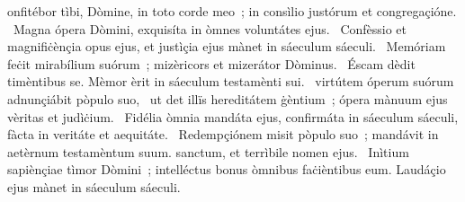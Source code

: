 { }
{%
onfitébor tìbi, Dòmine, in toto corde meo~; in consìlio justórum et congregaçióne. 
~Magna ópera Dòmini, exquisíta in òmnes voluntátes ejus. 
~Confèssio et magnifiċènçia opus ejus, et justìçia ejus mànet in sáeculum sáeculi. 
~Memóriam feċit mirabílium suórum~; mizèricors et mizerátor Dòminus. 
~Éscam dèdit timèntibus se. Mèmor èrit in sáeculum testamènti sui. 
~virtútem óperum suórum adnunçiábit pòpulo suo, 
~ut det illïs hereditátem ġèntium~; ópera mànuum ejus vèritas et judìċium. 
~Fidélia òmnia mandáta ejus, confirmáta in sáeculum sáeculi, fàcta in veritáte et aequitáte. 
~Redempçiónem misit pòpulo suo~; mandávit in aetèrnum testamèntum suum. sanctum, et terrìbile nomen ejus. 
~Inìtium sapiènçiae tìmor Dòmini~; intelléctus bonus òmnibus faċièntibus eum. Laudáçio ejus mànet in sáeculum sáeculi. 
}
